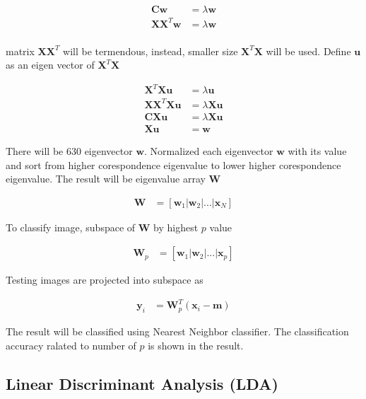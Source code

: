 \documentclass[11pt]{article}
\begin{document}
\begin{align*}
\mathbf{C} \mathbf{w} &= \lambda \mathbf{w} \\
 \mathbf{X}\mathbf{X}^T \mathbf{w} &= \lambda \mathbf{w} \\
\end{align*}

matrix  $\mathbf{X}\mathbf{X}^T$ will be termendous, instead, smaller size  $\mathbf{X}^T \mathbf{X}$ will be used. Define $\mathbf{u}$ as an eigen vector of $\mathbf{X}^T \mathbf{X}$

\begin{align*}
 \mathbf{X}^T \mathbf{X} \mathbf{u} &= \lambda \mathbf{u} \\
\mathbf{X}  \mathbf{X}^T \mathbf{X} \mathbf{u} &= \lambda \mathbf{X} \mathbf{u} \\
\mathbf{C} \mathbf{X} \mathbf{u} &= \lambda \mathbf{X} \mathbf{u} \\
 \mathbf{X} \mathbf{u} &= \mathbf{w}
\end{align*}

There will be 630 eigenvector $\mathbf{w}$. Normalized each eigenvector $\mathbf{w}$ with its value and sort from higher corespondence eigenvalue to lower higher corespondence eigenvalue. The result will be eigenvalue array $\mathbf{W}$ 

\begin{align*}
\mathbf{W} &= [\mathbf{w}_1  | \mathbf{w}_2 | ... | \mathbf{x}_N]
\end{align*}

To classify image, subspace of  $\mathbf{W}$  by highest $p$ value 

\begin{align*}
\mathbf{W}_p &= [\mathbf{w}_1  | \mathbf{w}_2 | ... | \mathbf{x}_p]
\end{align*}

Testing images are projected into subspace as 

\begin{align*}
\mathbf{y}_i &= \mathbf{W}_p^T (\mathbf{x}_i - \mathbf{m})
\end{align*}

The result will be classified using Nearest Neighbor classifier. The classification accuracy ralated to number of $p$ is shown in the result. 


\subsection*{Linear Discriminant Analysis (LDA)}
\end{document}
